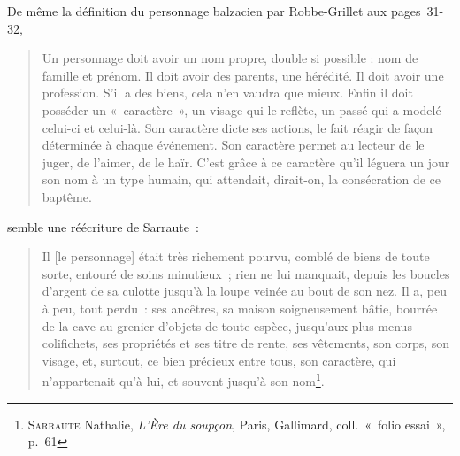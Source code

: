 \documentclass[12pt, a4paper]{article}
\begin{document}
De même la définition du personnage balzacien par Robbe-Grillet aux pages~31-32,
\begin{quote}
    Un personnage doit avoir un nom propre, double si possible : nom de famille et prénom. Il doit avoir des parents, une hérédité. Il doit avoir une profession. S’il a des biens, cela n’en vaudra que mieux. Enfin il doit posséder un «~caractère~», un visage qui le reflète, un passé qui a modelé celui-ci et celui-là. Son caractère dicte ses actions, le fait réagir de façon déterminée à chaque événement. Son caractère permet au lecteur de le juger, de l’aimer, de le haïr. C’est grâce à ce caractère qu’il léguera un jour son nom à un type humain, qui attendait, dirait-on, la consécration de ce baptême.
\end{quote}
semble une réécriture de Sarraute~:
\begin{quote}
    Il [le personnage] était très richement pourvu, comblé de biens de toute sorte, entouré de soins minutieux~; rien ne lui manquait, depuis les boucles d'argent de sa culotte jusqu'à la loupe veinée au bout de son nez. Il a, peu à peu, tout perdu~: ses ancêtres, sa maison soigneusement bâtie, bourrée de la cave au grenier d'objets de toute espèce, jusqu'aux plus menus colifichets, ses propriétés et ses titre de rente, ses vêtements, son corps, son visage, et, surtout, ce bien précieux entre tous, son caractère, qui n'appartenait qu'à lui, et souvent jusqu'à son nom\footnote{\textsc{Sarraute} Nathalie, \textit{L'Ère du soupçon}, Paris, Gallimard, coll.~«~folio essai~», p.~61}.  
\end{quote}
\end{document}

